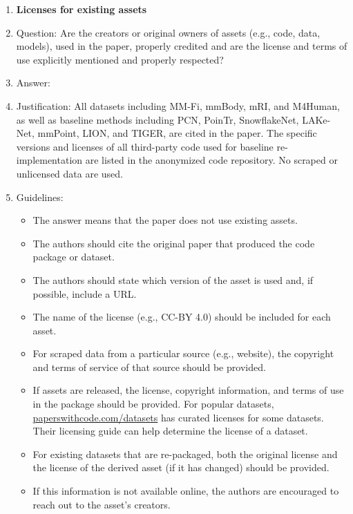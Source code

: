 \begin{enumerate}
\item {\bf Licenses for existing assets}
    \item[] Question: Are the creators or original owners of assets (e.g., code, data, models), used in the paper, properly credited and are the license and terms of use explicitly mentioned and properly respected?
    \item[] Answer: \answerYes{}
    \item[] Justification: All datasets including MM-Fi, mmBody, mRI, and M4Human, as well as baseline methods including PCN, PoinTr, SnowflakeNet, LAKe-Net, mmPoint, LION, and TIGER, are cited in the paper. The specific versions and licenses of all third-party code used for baseline re-implementation are listed in the anonymized code repository. No scraped or unlicensed data are used.
    \item[] Guidelines:
    \begin{itemize}
        \item The answer \answerNA{} means that the paper does not use existing assets.
        \item The authors should cite the original paper that produced the code package or dataset.
        \item The authors should state which version of the asset is used and, if possible, include a URL.
        \item The name of the license (e.g., CC-BY 4.0) should be included for each asset.
        \item For scraped data from a particular source (e.g., website), the copyright and terms of service of that source should be provided.
        \item If assets are released, the license, copyright information, and terms of use in the package should be provided. For popular datasets, \url{paperswithcode.com/datasets} has curated licenses for some datasets. Their licensing guide can help determine the license of a dataset.
        \item For existing datasets that are re-packaged, both the original license and the license of the derived asset (if it has changed) should be provided.
        \item If this information is not available online, the authors are encouraged to reach out to the asset's creators.
    \end{itemize}


\end{enumerate}
